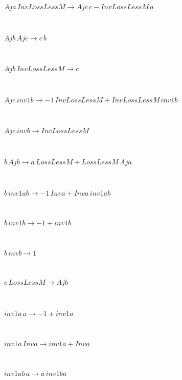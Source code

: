 \documentclass[rep10,leqno]{report}
\begin{document}
\begin{minipage}{6in}
$
Aja\,
 InvLossLessM\rightarrow Ajc\,
 c - InvLossLessM\,
 a
$
\end{minipage}\medskip \\
\begin{minipage}{6in}
$
Ajb\,
 Ajc\rightarrow c\,
 b
$
\end{minipage}\medskip \\
\begin{minipage}{6in}
$
Ajb\,
 InvLossLessM\rightarrow c
$
\end{minipage}\medskip \\
\begin{minipage}{6in}
$
Ajc\,
 inv1b\rightarrow -1\,
 InvLossLessM + InvLossLessM\,
 inv1b
$
\end{minipage}\medskip \\
\begin{minipage}{6in}
$
Ajc\,
 invb\rightarrow InvLossLessM
$
\end{minipage}\medskip \\
\begin{minipage}{6in}
$
b\,
 Ajb\rightarrow a\,
 LossLessM + LossLessM\,
 Aja
$
\end{minipage}\medskip \\
\begin{minipage}{6in}
$
b\,
 inv1ab\rightarrow -1\,
 Inva + Inva\,
 inv1ab
$
\end{minipage}\medskip \\
\begin{minipage}{6in}
$
b\,
 inv1b\rightarrow -1 + inv1b
$
\end{minipage}\medskip \\
\begin{minipage}{6in}
$
b\,
 invb\rightarrow 1
$
\end{minipage}\medskip \\
\begin{minipage}{6in}
$
c\,
 LossLessM\rightarrow Ajb
$
\end{minipage}\medskip \\
\begin{minipage}{6in}
$
inv1a\,
 a\rightarrow -1 + inv1a
$
\end{minipage}\medskip \\
\begin{minipage}{6in}
$
inv1a\,
 Inva\rightarrow inv1a + Inva
$
\end{minipage}\medskip \\
\begin{minipage}{6in}
$
inv1ab\,
 a\rightarrow a\,
 inv1ba
$
\end{minipage}\medskip \\
\end{document}
